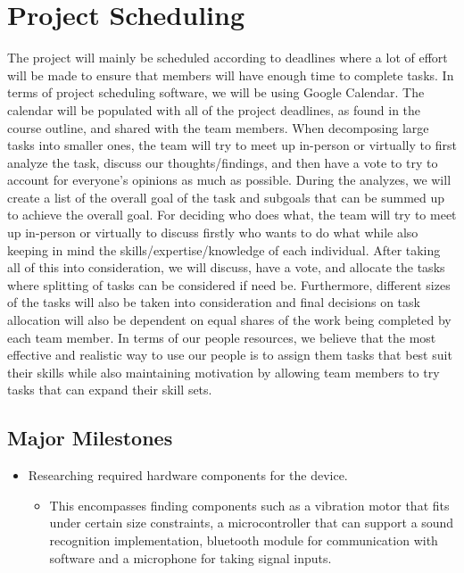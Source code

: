 \documentclass{article}
\begin{document}
\section{Project Scheduling}

The project will mainly be scheduled according to deadlines where a lot of effort
will be made to ensure that members will have enough time to complete tasks.
In terms of project scheduling software, we will be using Google Calendar.
The calendar will be populated with all of the project deadlines, as found in the
course outline, and shared with the team members. When decomposing large
tasks into smaller ones, the team will try to meet up in-person or virtually to
first analyze the task, discuss our thoughts/findings, and then have a vote to try
to account for everyone’s opinions as much as possible. During the analyzes, we
will create a list of the overall goal of the task and subgoals that can be summed
up to achieve the overall goal. For deciding who does what, the team will try to
meet up in-person or virtually to discuss firstly who wants to do what while also
keeping in mind the skills/expertise/knowledge of each individual. After taking
all of this into consideration, we will discuss, have a vote, and allocate the tasks
where splitting of tasks can be considered if need be. Furthermore, different
sizes of the tasks will also be taken into consideration and final decisions on task
allocation will also be dependent on equal shares of the work being completed by
each team member. In terms of our people resources, we believe that the most
effective and realistic way to use our people is to assign them tasks that best
suit their skills while also maintaining motivation by allowing team members to
try tasks that can expand their skill sets.
\subsection*{Major Milestones}

\begin{itemize}
	\item Researching required hardware components for the device.
	\begin{itemize}
		\item This encompasses finding components such as a vibration motor that fits under certain size constraints, a microcontroller that can support a sound recognition implementation, bluetooth module for communication with software and a microphone for taking signal inputs. 
	\end{itemize}
\end{itemize}
\end{document}
